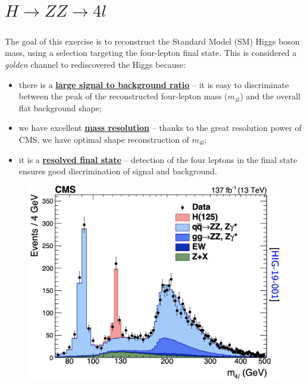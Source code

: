 \chapter{$H \rightarrow ZZ \rightarrow 4l$}
\justifying
\paragraph{}
The goal of this exercise is to reconstruct the Standard Model (SM) Higgs boson mass, using a selection targeting the four-lepton final state. This is considered a \textit{golden} channel to rediscovered the Higgs because:
\begin{itemize}
    \item there is a \textbf{\underline{ large signal to background ratio}} -- it is easy to discriminate between the peak of the reconstructed four-lepton mass ($m_{4l}$) and the overall flat background shape; 
    \item we have excellent \textbf{\underline{ mass resolution}} -- thanks to the great resolution power of CMS, we have optimal shape reconstruction of $m_{4l}$;
    \item it is a \textbf{\underline{ resolved final state}} -- detection of the four leptons in the final state ensures good discrimination of signal and background.
\end{itemize}

\begin{figure}[!h]
    \centering
    \includegraphics[scale=0.35]{images/plot.png}
    \caption{}
    \label{higgs_plot}
\end{figure}








